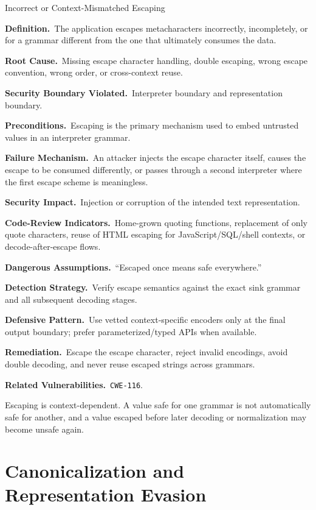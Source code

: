 \documentclass[11pt]{article}
\newcommand{\field}[1]{\par\smallskip\noindent\textbf{#1.}\ }
\newcommand{\cwe}[1]{\texttt{#1}}
\begin{document}
\begin{catalogbox}{Incorrect or Context-Mismatched Escaping}
\field{Definition}The application escapes metacharacters incorrectly, incompletely, or for a grammar different from the one that ultimately consumes the data.

\field{Root Cause}Missing escape character handling, double escaping, wrong escape convention, wrong order, or cross-context reuse.

\field{Security Boundary Violated}Interpreter boundary and representation boundary.

\field{Preconditions}Escaping is the primary mechanism used to embed untrusted values in an interpreter grammar.

\field{Failure Mechanism}An attacker injects the escape character itself, causes the escape to be consumed differently, or passes through a second interpreter where the first escape scheme is meaningless.

\field{Security Impact}Injection or corruption of the intended text representation.

\field{Code-Review Indicators}Home-grown quoting functions, replacement of only quote characters, reuse of HTML escaping for JavaScript/SQL/shell contexts, or decode-after-escape flows.

\field{Dangerous Assumptions}``Escaped once means safe everywhere.''

\field{Detection Strategy}Verify escape semantics against the exact sink grammar and all subsequent decoding stages.

\field{Defensive Pattern}Use vetted context-specific encoders only at the final output boundary; prefer parameterized/typed APIs when available.

\field{Remediation}Escape the escape character, reject invalid encodings, avoid double decoding, and never reuse escaped strings across grammars.

\field{Related Vulnerabilities}\cwe{CWE-116}.
\end{catalogbox}

\begin{securityprinciple}
Escaping is context-dependent. A value safe for one grammar is not automatically safe for another, and a value escaped before later decoding or normalization may become unsafe again.
\end{securityprinciple}
\clearpage

\section{Canonicalization and Representation Evasion}
\end{document}
